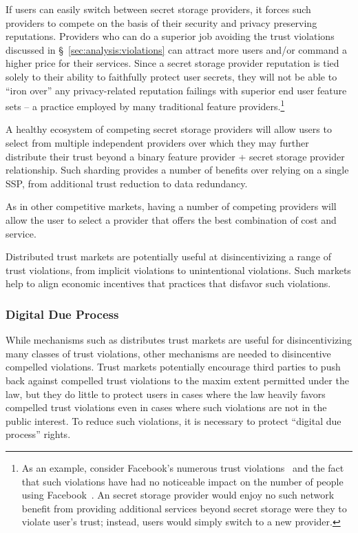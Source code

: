 \begin{packed_desc}
\item[Reputation:] If users can easily switch between secret storage
  providers, it forces such providers to compete on the basis of their
  security and privacy preserving reputations. Providers who can do a
  superior job avoiding the trust violations discussed in
  \S~\ref{sec:analysis:violations} can attract more users and/or
  command a higher price for their services. Since a secret storage
  provider reputation is tied solely to their ability to faithfully
  protect user secrets, they will not be able to ``iron over'' any
  privacy-related reputation failings with superior end user feature
  sets -- a practice employed by many traditional feature
  providers.\footnote{As an example, consider Facebook's numerous
    trust violations~\cite{goel2014, lomas2014, tsukayama2014} and the
    fact that such violations have had no noticeable impact on the
    number of people using Facebook~\cite{foster2014}. An secret
    storage provider would enjoy no such network benefit from
    providing additional services beyond secret storage were they to
    violate user's trust; instead, users would simply switch to a new
    provider.}
\item[Multiple Providers:] A healthy ecosystem of competing secret
  storage providers will allow users to select from multiple
  independent providers over which they may further distribute their
  trust beyond a binary feature provider + secret storage provider
  relationship. Such sharding provides a number of benefits over
  relying on a single SSP, from additional trust reduction to data
  redundancy.
\item[Cost:] As in other competitive markets, having a number of
  competing providers will allow the user to select a provider that
  offers the best combination of cost and service.
\end{packed_desc}

Distributed trust markets are potentially useful at disincentivizing a range
of trust violations, from implicit violations to unintentional
violations. Such markets help to align economic incentives that
practices that disfavor such violations.

\subsubsection{Digital Due Process}

While mechanisms such as distributes trust markets are useful for
disincentivizing many classes of trust violations, other mechanisms
are needed to disincentive compelled violations. Trust markets
potentially encourage third parties to push back against compelled
trust violations to the maxim extent permitted under the law, but they
do little to protect users in cases where the law heavily favors
compelled trust violations even in cases where such violations are not
in the public interest. To reduce such violations, it is necessary to
protect ``digital due process'' rights.

